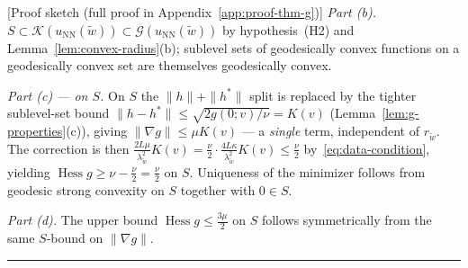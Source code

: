 \documentclass[twoside,11pt]{article}
\newcommand{\BlackBoxProof}{\rule{1.5ex}{1.5ex}}
\renewenvironment{proof}{\par\noindent{\bf Proof\ }}{\hfill\BlackBoxProof\par\medskip}
\newcommand{\Hess}{\operatorname{Hess} }
\newcommand{\NN}{\mathrm{NN}}
\newcommand{\calG}{\mathcal{G}}
\newcommand{\calK}{\mathcal{K}}
\begin{document}
\begin{proof}[Proof sketch (full proof in Appendix~\ref{app:proof-thm-g})]
\smallskip\noindent\emph{Part (b).} $S \subset \calK(u_\NN(\tilde w)) \subset \calG(u_\NN(\tilde w))$ by hypothesis~(H2) and Lemma~\ref{lem:convex-radius}(b); sublevel sets of geodesically convex functions on a geodesically convex set are themselves geodesically convex.

\smallskip\noindent\emph{Part (c) — on $S$.}
On $S$ the $\|h\|+\|h^*\|$ split is replaced by the tighter sublevel-set bound $\|h-h^*\|\le\sqrt{2g(0;v)/\nu}=K(v)$ (Lemma~\ref{lem:g-properties}(c)), giving $\|\nabla g\|\le\mu K(v)$ --- a \emph{single} term, independent of $r_{\tilde w}$. The correction is then
\(\frac{2L\mu}{\lambda_{\tilde w}^{2}}K(v)=\frac{\nu}{2}\cdot\frac{4L\kappa}{\lambda_{\tilde w}^2}K(v)\le\frac{\nu}{2}\) by~\eqref{eq:data-condition}, yielding $\Hess g\ge \nu-\tfrac{\nu}{2}=\tfrac{\nu}{2}$ on $S$. Uniqueness of the minimizer follows from geodesic strong convexity on $S$ together with $0\in S$.

\smallskip\noindent\emph{Part (d).} The upper bound $\Hess g \le \tfrac{3\mu}{2}$ on $S$ follows symmetrically from the same $S$-bound on $\|\nabla g\|$.
\end{proof}
\end{document}
